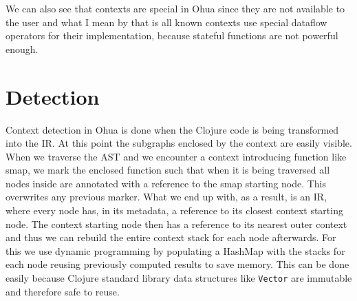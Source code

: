 We can also see that contexts are special in Ohua since they are not available to the user and what I mean by that is all known contexts use special dataflow operators for their implementation, because stateful functions are not powerful enough.


\section{Detection}

Context detection in Ohua is done when the Clojure code is being transformed into the IR.
At this point the subgraphs enclosed by the context are easily visible.
When we traverse the AST and we encounter a context introducing function like smap, we mark the enclosed function such that when it is being traversed all nodes inside are annotated with a reference to the smap starting node.
This overwrites any previous marker.
What we end up with, as a result, is an IR, where every node has, in its metadata, a reference to its closest context starting node.
The context starting node then has a reference to its nearest outer context and thus we can rebuild the entire context stack for each node afterwards.
For this we use dynamic programming by populating a HashMap with the stacks for each node reusing previously computed results to save memory.
This can be done easily because Clojure standard library data structures like \texttt{Vector} are immutable and therefore safe to reuse.

